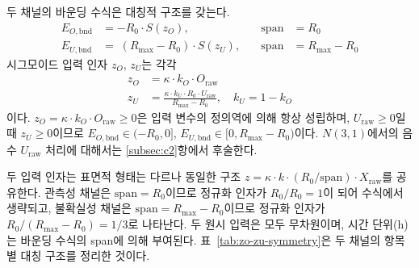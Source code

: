 \medskip
두 채널의 바운딩 수식은  대칭적 구조를 갖는다.
\begin{align}
  E_{O,\text{bnd}} &= -R_0 \cdot S(z_O),
    &\quad \text{span} &= R_0
    \label{eq:E_O_bnd} \\[4pt]
  E_{U,\text{bnd}} &= \;(R_{\max} - R_0) \cdot S(z_U),
    &\quad \text{span} &= R_{\max} - R_0
    \label{eq:E_U_bnd}
\end{align}
시그모이드 입력 인자 $z_O$, $z_U$는  각각
\begin{align}
  z_O &= \kappa \cdot k_O \cdot O_{\text{raw}}
    \label{eq:z_O} \\[4pt]
  z_U &= \frac{\kappa \cdot k_U \cdot R_0 \cdot U_{\text{raw}}}{R_{\max} - R_0},
    \quad k_U = 1 - k_O
    \label{eq:z_U}
\end{align}
이다. $z_O = \kappa \cdot k_O \cdot O_{\text{raw}} \geq 0$은
입력 변수의 정의역에 의해 항상 성립하며,
$U_{\text{raw}} \geq 0$일 때 $z_U \geq 0$이므로
$E_{O,\text{bnd}} \in (-R_0, 0]$,\;
$E_{U,\text{bnd}} \in [0, R_{\max} - R_0)$이다.
$N(3,1)$에서의 음수 $U_{\text{raw}}$ 처리에 대해서는
\ref{subsec:c2}항에서 후술한다.


두 입력 인자는 표면적 형태는 다르나 동일한 구조 $z = \kappa \cdot k \cdot (R_0/\mathrm{span})
\cdot X_{\text{raw}}$를 공유한다. 관측성 채널은 $\mathrm{span} = R_0$이므로 정규화 인자가
$R_0/R_0 = 1$이 되어 수식에서 생략되고, 불확실성 채널은 $\mathrm{span} = R_{\max} - R_0$이므로
정규화 인자가 $R_0/(R_{\max}-R_0) = 1/3$로 나타난다. 두 원시 입력은 모두 무차원이며,
시간 단위(h)는 바운딩 수식의 span에 의해 부여된다.
\p{[}표~\ref{tab:zo-zu-symmetry}\p{]}은 두 채널의 항목별 대칭 구조를 정리한 것이다.

